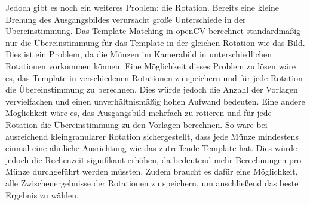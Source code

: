 Jedoch gibt es noch ein weiteres Problem: die Rotation. Bereits eine kleine Drehung des Ausgangsbildes verursacht große Unterschiede in der Übereinstimmung. Das Template Matching in openCV berechnet standardmäßig nur die Übereinstimmung für das Template in der gleichen Rotation wie das Bild. Dies ist ein Problem, da die Münzen im Kamerabild in unterschiedlichen Rotationen vorkommen können. Eine Möglichkeit dieses Problem zu lösen wäre es, das Template in verschiedenen Rotationen zu speichern und für jede Rotation die Übereinstimmung zu berechnen. Dies würde jedoch die Anzahl der Vorlagen vervielfachen und einen unverhältnismäßig hohen Aufwand bedeuten. Eine andere Möglichkeit wäre es, das Ausgangsbild mehrfach zu rotieren und für jede Rotation die Übereinstimmung zu den Vorlagen berechnen. So wäre bei ausreichend kleingranularer Rotation sichergestellt, dass jede Münze mindestens einmal eine ähnliche Ausrichtung wie das zutreffende Template hat. Dies würde jedoch die Rechenzeit signifikant erhöhen, da bedeutend mehr Berechnungen pro Münze durchgeführt werden müssten. Zudem braucht es dafür eine Möglichkeit, alle Zwischenergebnisse der Rotationen zu speichern, um anschließend das beste Ergebnis zu wählen.